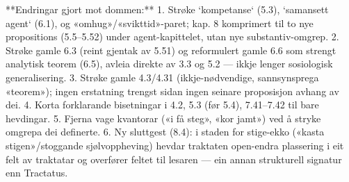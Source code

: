 **Endringar gjort mot dommen:**
1. Strøke `kompetanse` (5.3), `samansett agent` (6.1), og «omhug»/«svikttid»-paret; kap. 8 komprimert til to nye propositions (5.5–5.52) under agent-kapittelet, utan nye substantiv-omgrep.
2. Strøke gamle 6.3 (reint gjentak av 5.51) og reformulert gamle 6.6 som strengt analytisk teorem (6.5), avleia direkte av 3.3 og 5.2 — ikkje lenger sosiologisk generalisering.
3. Strøke gamle 4.3/4.31 (ikkje-nødvendige, sannsynsprega «teorem»); ingen erstatning trengst sidan ingen seinare proposisjon avhang av dei.
4. Korta forklarande bisetningar i 4.2, 5.3 (før 5.4), 7.41–7.42 til bare hevdingar.
5. Fjerna vage kvantorar («i få steg», «kor jamt») ved å stryke omgrepa dei definerte.
6. Ny sluttgest (8.4): i staden for stige-ekko («kasta stigen»/stoggande sjølvoppheving) hevdar traktaten open-endra plassering i eit felt av traktatar og overfører feltet til lesaren — ein annan strukturell signatur enn Tractatus.

